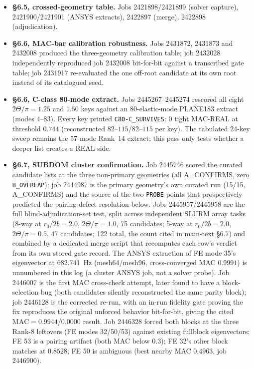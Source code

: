 \documentclass[11pt]{article}
\begin{document}
\begin{itemize}
FE\#23.
\item \textbf{\S6.5, crossed-geometry table.} Jobs 2421898/2421899
(solver capture), 2421900/2421901 (ANSYS extracts), 2422897 (merge),
2422898 (adjudication).
\item \textbf{\S6.6, MAC-bar calibration robustness.} Jobs 2431872,
2431873 and 2432008 produced the three-geometry calibration table; job
2432028 independently reproduced job 2432008 bit-for-bit against a
transcribed gate table; job 2431917 re-evaluated the one off-root
candidate at its own root instead of its catalogued seed.
\item \textbf{\S6.6, C-class 80-mode extract.} Jobs 2445267--2445274
rescored all eight $2\Theta/\pi=1.25$ and $1.50$ keys against an
80-elastic-mode PLANE183 extract (modes $4$--$83$). Every key printed
\texttt{C80-C\_SURVIVES}: 0 tight MAC-REAL at threshold $0.744$
(reconstructed $82$--$115$/$82$--$115$ per key). The tabulated 24-key
sweep remains the 57-mode Rank~14 extract; this pass only tests whether
a deeper list creates a REAL side.
\item \textbf{\S6.7, SUBDOM cluster confirmation.} Job 2445746 scored the
curated candidate lists at the three non-primary geometries (all
A\_CONFIRMS, zero \texttt{B\_OVERLAP}); job 2444987 is the primary
geometry's own curated run (15/15, A\_CONFIRMS) and the source of the two
\texttt{PROBE} points that prospectively predicted the pairing-defect
resolution below. Jobs 2445957/2445958 are the full blind-adjudication-set
test, split across independent SLURM array tasks (8-way at
$r_0/2b=2.0$, $2\Theta/\pi=1.0$, 75 candidates; 5-way at
$r_0/2b=2.0$, $2\Theta/\pi=0.5$, 47 candidates; 122 total, the
count cited in main-text \S6.7) and combined by a dedicated merge
script that recomputes each row's verdict from its own stored gate
record. The ANSYS extraction of FE
mode 35's eigenvector at 682.741~Hz (mesh64/mesh96, cross-converged MAC
$0.9991$) is unnumbered in this log (a cluster ANSYS job, not a solver
probe). Job 2446007 is the first MAC cross-check attempt, later found to
have a block-selection bug (both candidates silently reconstructed the
same parity block); job 2446128 is the corrected re-run, with an in-run
fidelity gate proving the fix reproduces the original unforced behavior
bit-for-bit, giving the cited $\mathrm{MAC}=0.9944$/$0.0000$ result.
Job 2446328 forced both blocks at the three Rank-8 leftovers (FE modes
32/50/53) against existing fullblock eigenvectors: FE 53 is a pairing
artifact (both MAC below $0.3$); FE 32's other block matches at
$0.8528$; FE 50 is ambiguous (best nearby MAC $0.4963$, job 2446900).

\end{itemize}
\end{document}
